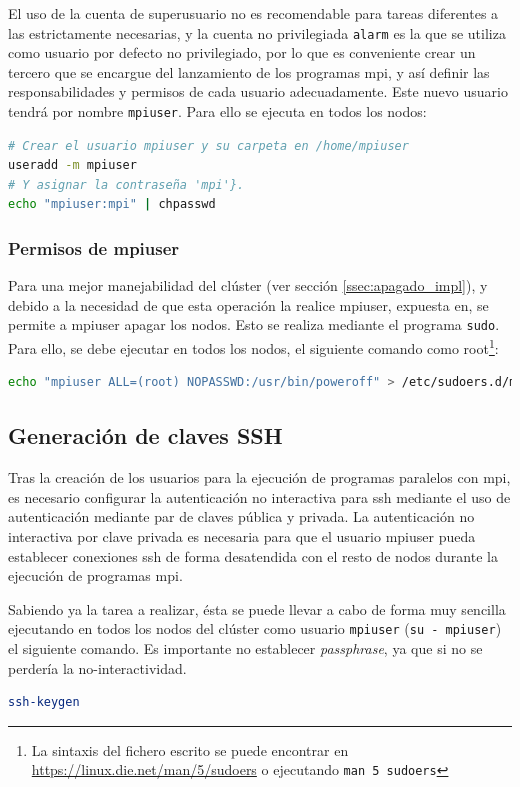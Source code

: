El uso de la cuenta de superusuario no es recomendable para tareas diferentes a las estrictamente necesarias, y la cuenta no privilegiada \texttt{alarm} es la que se utiliza como usuario por defecto no privilegiado, por lo que es conveniente crear un tercero que se encargue del lanzamiento de los programas \acrshort{mpi}, y así definir las responsabilidades y permisos de cada usuario adecuadamente. Este nuevo usuario tendrá por nombre \texttt{mpiuser}. Para ello se ejecuta en todos los nodos:

\begin{lstlisting}[language=bash]
# Crear el usuario mpiuser y su carpeta en /home/mpiuser
useradd -m mpiuser
# Y asignar la contraseña 'mpi'}.
echo "mpiuser:mpi" | chpasswd
\end{lstlisting}

\subsubsection{Permisos de mpiuser}
Para una mejor manejabilidad del clúster (ver sección \ref{ssec:apagado_impl}), y debido a la necesidad de que esta operación la realice mpiuser, expuesta en, se permite a mpiuser apagar los nodos. Esto se realiza mediante el programa \texttt{sudo}. Para ello, se debe ejecutar en todos los nodos, el siguiente comando como root\footnote{La sintaxis del fichero escrito se puede encontrar en \url{https://linux.die.net/man/5/sudoers} o ejecutando \texttt{man 5 sudoers}}:

\begin{lstlisting}[language=bash]
echo "mpiuser ALL=(root) NOPASSWD:/usr/bin/poweroff" > /etc/sudoers.d/mpiuser_poweroff
\end{lstlisting}

\subsection{Generación de claves SSH}
\label{ssec:gen_ssh}
Tras la creación de los usuarios para la ejecución de programas paralelos con \acrshort{mpi}, es necesario configurar la autenticación no interactiva para \acrshort{ssh} mediante el uso de autenticación mediante par de claves pública y privada. La autenticación no interactiva por clave privada es necesaria para que el usuario mpiuser pueda establecer conexiones \acrshort{ssh} de forma desatendida con el resto de nodos durante la ejecución de programas \acrshort{mpi}.

Sabiendo ya la tarea a realizar, ésta se puede llevar a cabo de forma muy sencilla ejecutando en todos los nodos del clúster como usuario \texttt{mpiuser} (\texttt{su - mpiuser}) el siguiente comando. Es importante no establecer \textit{passphrase}, ya que si no se perdería la no-interactividad.
\begin{lstlisting}[language=bash]
ssh-keygen
\end{lstlisting}

